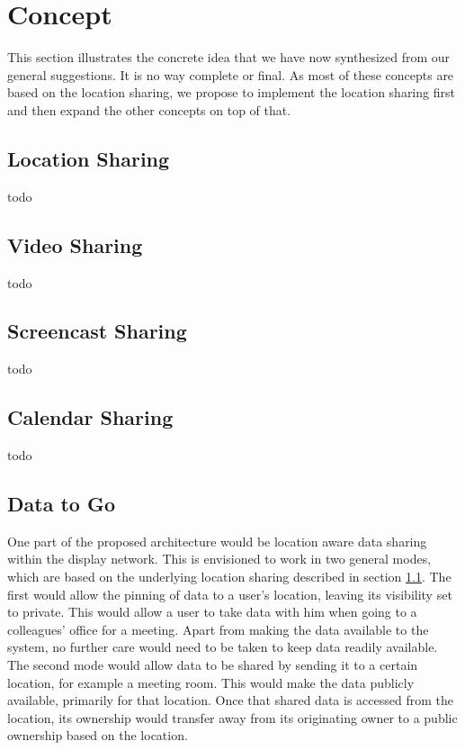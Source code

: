 \section{Concept}

This section illustrates the concrete idea that we have now synthesized from our general suggestions.
It is no way complete or final.
As most of these concepts are based on the location sharing, we propose to implement the location sharing first and then expand the other concepts on top of that.

\subsection{Location Sharing}
\label{location_sharing}

todo

\subsection{Video Sharing}

todo

\subsection{Screencast Sharing}

todo

\subsection{Calendar Sharing}

todo

\subsection{Data to Go}
\label{data2go}

One part of the proposed architecture would be location aware data sharing within the display network.
This is envisioned to work in two general modes, which are based on the underlying location sharing described in section \ref{location_sharing}.
The first would allow the pinning of data to a user's location, leaving its visibility set to private.
This would allow a user to take data with him when going to a colleagues' office for a meeting.
Apart from making the data available to the system, no further care would need to be taken to keep data readily available.
The second mode would allow data to be shared by sending it to a certain location, for example a meeting room.
This would make the data publicly available, primarily for that location.
Once that shared data is accessed from the location, its ownership would transfer away from its originating owner to a public ownership based on the location.

